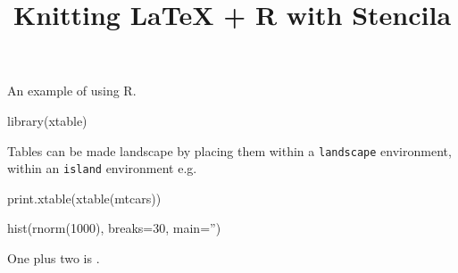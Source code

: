 \documentclass{article}
\begin{document}
\title{Knitting LaTeX + R with Stencila}

\p An example of using R.

\begin{chunk}[r,hide]
library(xtable)
\end{chunk}

\p Tables can be made landscape by placing them within a \verb|landscape| environment, within an \verb|island| environment  e.g.

\begin{island}
\begin{landscape}
\begin{chunk}
print.xtable(xtable(mtcars))
\end{chunk}
\end{landscape}
\end{island}

\begin{chunk}
hist(rnorm(1000), breaks=30, main='')
\end{chunk}

\p One plus two is .
\end{document}
